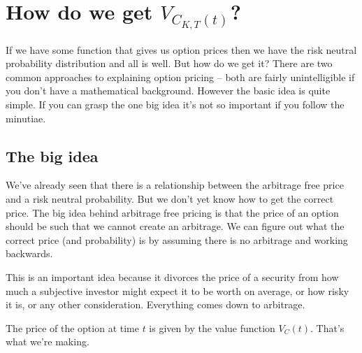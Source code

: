 
\section{How do we get $V_{C_{K,T}(t)}$?}
If we have some function that gives us option prices then we have the risk neutral probability distribution and all is well. But how do we get it? There are two common approaches to explaining option pricing -- both are fairly unintelligible if you don't have a mathematical background. However the basic idea is quite simple. If you can grasp the one big idea it's not so important if you follow the minutiae.


\subsection{The big idea}

We've already seen that there is a relationship between the arbitrage free price and a risk neutral probability. But we don't yet know how to get the correct price. The big idea behind arbitrage free pricing is that the price of an option should be such that we cannot create an arbitrage. We can figure out what the correct price (and probability) is by assuming there is no arbitrage and working backwards.

This is an important idea because it divorces the price of a security from how much a subjective investor might expect it to be worth on average, or how risky it is, or any other consideration. Everything comes down to arbitrage.

The price of the option at time $t$ is given by the value function $V_{C}(t)$. That's what we're making.



